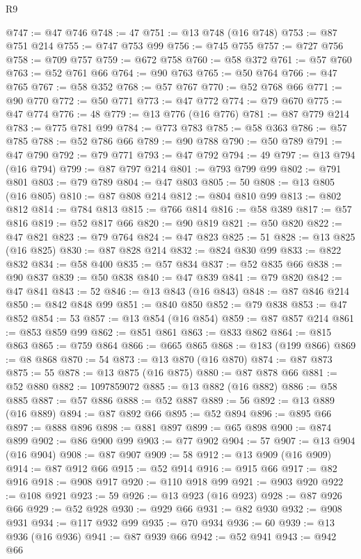\begin{lexlean}{R9}
\begin{coremodule}
@747 := @47 @746
@748 := 47
@751 := @13 @748 (@16 @748)
@753 := @87 @751 @214
@755 := @747 @753 @99
@756 := @745 @755
@757 := @727 @756
@758 := @709 @757
@759 := @672 @758
@760 := @58 @372
@761 := @57 @760
@763 := @52 @761 @66
@764 := @90 @763
@765 := @50 @764
@766 := @47 @765
@767 := @58 @352
@768 := @57 @767
@770 := @52 @768 @66
@771 := @90 @770
@772 := @50 @771
@773 := @47 @772
@774 := @79 @670
@775 := @47 @774
@776 := 48
@779 := @13 @776 (@16 @776)
@781 := @87 @779 @214
@783 := @775 @781 @99
@784 := @773 @783
@785 := @58 @363
@786 := @57 @785
@788 := @52 @786 @66
@789 := @90 @788
@790 := @50 @789
@791 := @47 @790
@792 := @79 @771
@793 := @47 @792
@794 := 49
@797 := @13 @794 (@16 @794)
@799 := @87 @797 @214
@801 := @793 @799 @99
@802 := @791 @801
@803 := @79 @789
@804 := @47 @803
@805 := 50
@808 := @13 @805 (@16 @805)
@810 := @87 @808 @214
@812 := @804 @810 @99
@813 := @802 @812
@814 := @784 @813
@815 := @766 @814
@816 := @58 @389
@817 := @57 @816
@819 := @52 @817 @66
@820 := @90 @819
@821 := @50 @820
@822 := @47 @821
@823 := @79 @764
@824 := @47 @823
@825 := 51
@828 := @13 @825 (@16 @825)
@830 := @87 @828 @214
@832 := @824 @830 @99
@833 := @822 @832
@834 := @58 @400
@835 := @57 @834
@837 := @52 @835 @66
@838 := @90 @837
@839 := @50 @838
@840 := @47 @839
@841 := @79 @820
@842 := @47 @841
@843 := 52
@846 := @13 @843 (@16 @843)
@848 := @87 @846 @214
@850 := @842 @848 @99
@851 := @840 @850
@852 := @79 @838
@853 := @47 @852
@854 := 53
@857 := @13 @854 (@16 @854)
@859 := @87 @857 @214
@861 := @853 @859 @99
@862 := @851 @861
@863 := @833 @862
@864 := @815 @863
@865 := @759 @864
@866 := @665 @865
@868 := @183 (@199 @866)
@869 := @8 @868
@870 := 54
@873 := @13 @870 (@16 @870)
@874 := @87 @873
@875 := 55
@878 := @13 @875 (@16 @875)
@880 := @87 @878 @66
@881 := @52 @880
@882 := 1097859072
@885 := @13 @882 (@16 @882)
@886 := @58 @885
@887 := @57 @886
@888 := @52 @887
@889 := 56
@892 := @13 @889 (@16 @889)
@894 := @87 @892 @66
@895 := @52 @894
@896 := @895 @66
@897 := @888 @896
@898 := @881 @897
@899 := @65 @898
@900 := @874 @899
@902 := @86 @900 @99
@903 := @77 @902
@904 := 57
@907 := @13 @904 (@16 @904)
@908 := @87 @907
@909 := 58
@912 := @13 @909 (@16 @909)
@914 := @87 @912 @66
@915 := @52 @914
@916 := @915 @66
@917 := @82 @916
@918 := @908 @917
@920 := @110 @918 @99
@921 := @903 @920
@922 := @108 @921
@923 := 59
@926 := @13 @923 (@16 @923)
@928 := @87 @926 @66
@929 := @52 @928
@930 := @929 @66
@931 := @82 @930
@932 := @908 @931
@934 := @117 @932 @99
@935 := @70 @934
@936 := 60
@939 := @13 @936 (@16 @936)
@941 := @87 @939 @66
@942 := @52 @941
@943 := @942 @66

\end{coremodule}
\end{lexlean}
